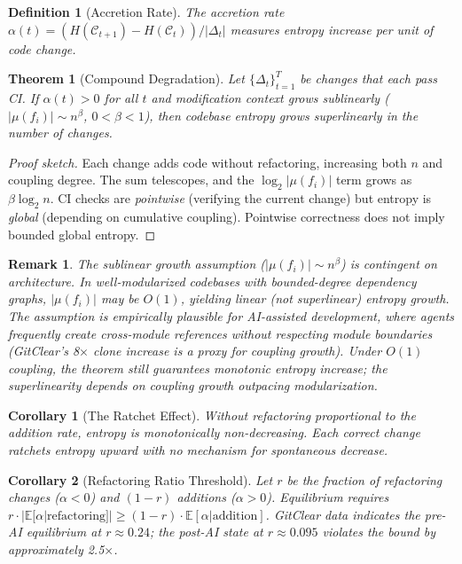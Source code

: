\documentclass[11pt, a4paper, copyright]{googledeepmind}
\newtheorem{definition}{Definition}[section]
\newtheorem{theorem}{Theorem}[section]
\newtheorem{corollary}{Corollary}[section]
\newtheorem*{remark}{Remark}
\begin{document}
\begin{definition}[Accretion Rate]
The accretion rate $\alpha(t) = (H(\mathcal{C}_{t+1}) - H(\mathcal{C}_t)) / |\Delta_t|$ measures entropy increase per unit of code change.
\end{definition}

\begin{theorem}[Compound Degradation]
\label{thm:compound}
Let $\{\Delta_t\}_{t=1}^{T}$ be changes that each pass CI. If $\alpha(t) > 0$ for all $t$ and modification context grows sublinearly ($|\mu(f_i)| \sim n^\beta$, $0 < \beta < 1$), then codebase entropy grows superlinearly in the number of changes.
\end{theorem}

\begin{proof}[Proof sketch]
Each change adds code without refactoring, increasing both $n$ and coupling degree. The sum telescopes, and the $\log_2 |\mu(f_i)|$ term grows as $\beta \log_2 n$. CI checks are \emph{pointwise} (verifying the current change) but entropy is \emph{global} (depending on cumulative coupling). Pointwise correctness does not imply bounded global entropy.
\end{proof}

\begin{remark}
The sublinear growth assumption ($|\mu(f_i)| \sim n^\beta$) is contingent on architecture. In well-modularized codebases with bounded-degree dependency graphs, $|\mu(f_i)|$ may be $O(1)$, yielding linear (not superlinear) entropy growth. The assumption is empirically plausible for AI-assisted development, where agents frequently create cross-module references without respecting module boundaries (GitClear's 8$\times$ clone increase is a proxy for coupling growth). Under $O(1)$ coupling, the theorem still guarantees monotonic entropy increase; the superlinearity depends on coupling growth outpacing modularization.
\end{remark}

\begin{corollary}[The Ratchet Effect]
Without refactoring proportional to the addition rate, entropy is monotonically non-decreasing. Each correct change ratchets entropy upward with no mechanism for spontaneous decrease.
\end{corollary}

\begin{corollary}[Refactoring Ratio Threshold]
\label{cor:refactoring}
Let $r$ be the fraction of refactoring changes ($\alpha < 0$) and $(1-r)$ additions ($\alpha > 0$). Equilibrium requires $r \cdot |\mathbb{E}[\alpha | \text{refactoring}]| \geq (1-r) \cdot \mathbb{E}[\alpha | \text{addition}]$. GitClear data indicates the pre-AI equilibrium at $r \approx 0.24$; the post-AI state at $r \approx 0.095$ violates the bound by approximately 2.5$\times$.
\end{corollary}
\end{document}
